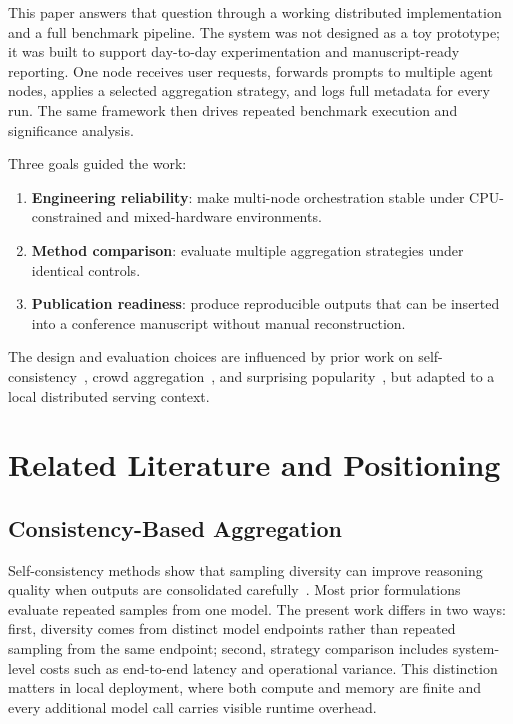 \documentclass[conference]{IEEEtran}
\begin{document}
This paper answers that question through a working distributed implementation and a full benchmark pipeline. The system was not designed as a toy prototype; it was built to support day-to-day experimentation and manuscript-ready reporting. One node receives user requests, forwards prompts to multiple agent nodes, applies a selected aggregation strategy, and logs full metadata for every run. The same framework then drives repeated benchmark execution and significance analysis.

Three goals guided the work:
\begin{enumerate}
  \item \textbf{Engineering reliability}: make multi-node orchestration stable under CPU-constrained and mixed-hardware environments.
  \item \textbf{Method comparison}: evaluate multiple aggregation strategies under identical controls.
  \item \textbf{Publication readiness}: produce reproducible outputs that can be inserted into a conference manuscript without manual reconstruction.
\end{enumerate}

The design and evaluation choices are influenced by prior work on self-consistency~\cite{wang2022selfconsistency}, crowd aggregation~\cite{surowiecki2005wisdom}, and surprising popularity~\cite{prelec2017surprisingly}, but adapted to a local distributed serving context.

\section{Related Literature and Positioning}
\subsection{Consistency-Based Aggregation}
Self-consistency methods show that sampling diversity can improve reasoning quality when outputs are consolidated carefully~\cite{wang2022selfconsistency}. Most prior formulations evaluate repeated samples from one model. The present work differs in two ways: first, diversity comes from distinct model endpoints rather than repeated sampling from the same endpoint; second, strategy comparison includes system-level costs such as end-to-end latency and operational variance. This distinction matters in local deployment, where both compute and memory are finite and every additional model call carries visible runtime overhead.
\end{document}
